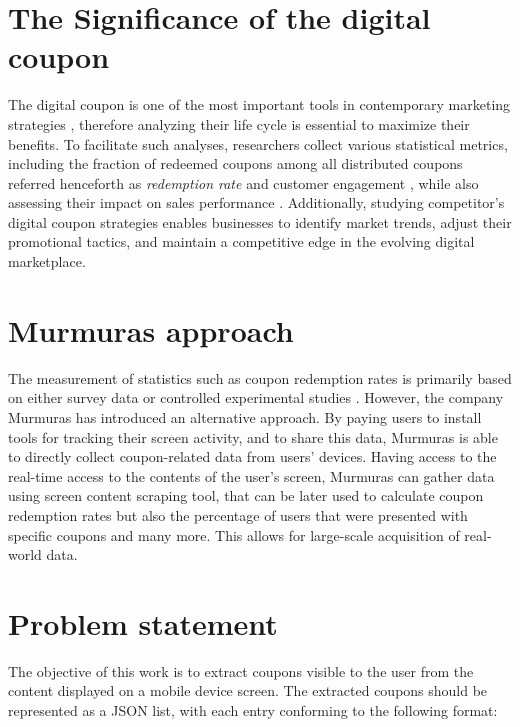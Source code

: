 \documentclass[licencjacka,en]{pracamgr}
\begin{document}
\section{The Significance of the digital coupon}
The digital coupon is one of the most important tools in contemporary marketing strategies \cite{targeted_reminders}, therefore analyzing their life cycle is essential to maximize their benefits. To facilitate such analyses, researchers collect various statistical metrics, including the fraction of redeemed coupons among all distributed coupons referred henceforth as \emph{redemption rate} \cite{danaher2015} and customer engagement \cite{jayadharshini2023}, while also assessing their impact on sales performance \cite{jayadharshini2023}.  Additionally, studying competitor's digital coupon strategies enables businesses to identify market trends, adjust their promotional tactics, and maintain a competitive edge in the evolving digital marketplace.

\section{Murmuras approach}
The measurement of statistics such as coupon redemption rates is primarily based on either survey data \cite{nayal2021} or controlled experimental studies \cite{danaher2015}. However, the company Murmuras \cite{murmuras} has introduced an alternative approach. By paying users to install tools for tracking their screen activity, and to share this data, Murmuras is able to directly collect coupon-related data from users' devices. Having access to the real-time access to the contents of the user's screen, Murmuras can gather data using screen content scraping tool, that can be later used to calculate coupon redemption rates but also the percentage of users that were presented with specific coupons and many more. This allows for large-scale acquisition of real-world data.

\section{Problem statement} \label{sec:coupon_model}

The objective of this work is to extract coupons visible to the user from the content displayed on a mobile device screen. The extracted coupons should be represented as a JSON list, with each entry conforming to the following format:
\end{document}
